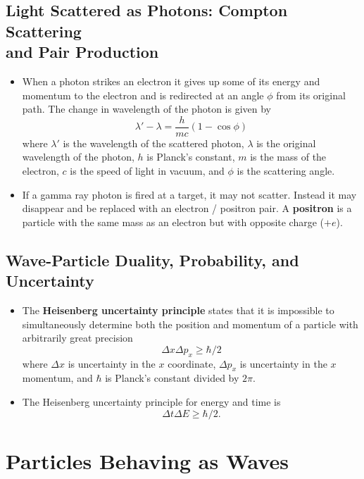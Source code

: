 \documentclass{article}
\begin{document}
\subsection{Light Scattered as Photons: Compton Scattering\\and Pair Production}

\begin{itemize}
  \item When a photon strikes an electron it gives up some of its energy and momentum to the electron and is redirected at an angle $\phi$ from its original path. The change in wavelength of the photon is given by \[\lambda' - \lambda = \frac{h}{m c} (1 - \cos \phi)\] where $\lambda'$ is the wavelength of the scattered photon, $\lambda$ is the original wavelength of the photon, $h$ is Planck's constant, $m$ is the mass of the electron, $c$ is the speed of light in vacuum, and $\phi$ is the scattering angle.

  \item If a gamma ray photon is fired at a target, it may not scatter. Instead it may disappear and be replaced with an electron / positron pair. A \textbf{positron} is a particle with the same mass as an electron but with opposite charge ($+e$).
\end{itemize}

\subsection{Wave-Particle Duality, Probability, and Uncertainty}

\begin{itemize}
  \item The \textbf{Heisenberg uncertainty principle} states that it is impossible to simultaneously determine both the position and momentum of a particle with arbitrarily great precision \[\Delta x \Delta p_x \ge \hbar / 2\] where $\Delta x$ is uncertainty in the $x$ coordinate, $\Delta p_x$ is uncertainty in the $x$ momentum, and $\hbar$ is Planck's constant divided by $2 \pi$.

  \item The Heisenberg uncertainty principle for energy and time is \[\Delta t \Delta E \ge \hbar / 2.\]
\end{itemize}

\section{Particles Behaving as Waves}
\end{document}
